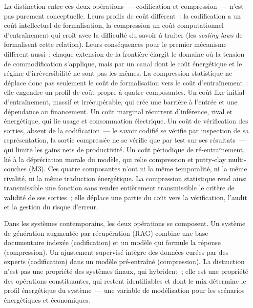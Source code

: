 La distinction entre ces deux opérations~--- codification et compression~--- n'est pas purement conceptuelle. Leurs profils de coût diffèrent~: la codification a un coût intellectuel de formalisation, la compression un coût computationnel d'entraînement qui croît avec la difficulté du savoir à traiter (les \emph{scaling laws} de \textcite{kaplan_scaling_2020} formalisent cette relation). Leurs conséquences pour le premier mécanisme diffèrent aussi~: chaque extension de la frontière élargit le domaine où la tension de commodification s'applique, mais par un canal dont le coût énergétique et le régime d'irréversibilité ne sont pas les mêmes. La compression statistique ne déplace donc pas seulement le coût de formalisation vers le coût d'entraînement~: elle engendre un profil de coût propre à quatre composantes. Un coût fixe initial d'entraînement, massif et irrécupérable, qui crée une barrière à l'entrée et une dépendance au financement. Un coût marginal récurrent d'inférence, rival et énergétique, qui lie usage et consommation électrique. Un coût de vérification des sorties, absent de la codification~--- le savoir codifié se vérifie par inspection de sa représentation, la sortie compressée ne se vérifie que par test sur ses résultats~--- qui limite les gains nets de productivité. Un coût périodique de ré-entraînement, lié à la dépréciation morale du modèle, qui relie compression et putty-clay multi-couches (M3). Ces quatre composantes n'ont ni la même temporalité, ni la même rivalité, ni la même traduction énergétique. La compression statistique rend ainsi transmissible une fonction sans rendre entièrement transmissible le critère de validité de ses sorties~; elle déplace une partie du coût vers la vérification, l'audit et la gestion du risque d'erreur.

Dans les systèmes contemporains, les deux opérations se composent. Un système de génération augmentée par récupération (RAG) combine une base documentaire indexée (codification) et un modèle qui formule la réponse (compression). Un ajustement supervisé intègre des données curées par des experts (codification) dans un modèle pré-entraîné (compression). La distinction n'est pas une propriété des systèmes finaux, qui hybrident~; elle est une propriété des opérations constituantes, qui restent identifiables et dont le mix détermine le profil énergétique du système~--- une variable de modélisation pour les scénarios énergétiques et économiques.

